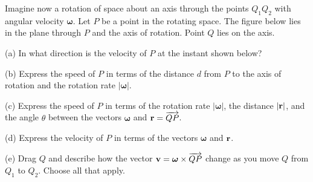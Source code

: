 \documentclass{ximera}
\begin{document}
\begin{question}  \label{Qdstjigvgf:Cross}
Imagine now a rotation of space about an axis through the points $Q_1Q_2$ with angular velocity $\boldsymbol{\omega}$. Let $P$ be a point in the rotating space. The figure below lies in the plane through $P$ and the axis of rotation. Point $Q$ lies on the axis.

(a) In what direction is the velocity of $P$ at the instant shown below?

(b) Express the speed of $P$ in terms of the distance $d$ from $P$ to the axis of rotation and the rotation rate $|\boldsymbol{\omega}|$.

(c) Express the speed of $P$ in terms of the rotation rate $|\boldsymbol{\omega}|$, the distance $|{\bf r}|$, and the angle $\theta$ between the vectors $\boldsymbol{\omega}$ and ${\bf r} = \overrightarrow{QP}$.

(d) Express the velocity of $P$ in terms of the vectors $\boldsymbol{\omega}$ and ${\bf r}$.


(e) Drag $Q$ and describe how the vector ${\bf v} = \boldsymbol{\omega}\times {\overrightarrow{QP}}$ change as you move $Q$ from $Q_1$ to $Q_2$. Choose all that apply.

\begin{selectAll}   
\end{selectAll}    





 
\begin{onlineOnly}
    \begin{center}
\end{center}
\end{onlineOnly}

\end{question}
\end{document}
